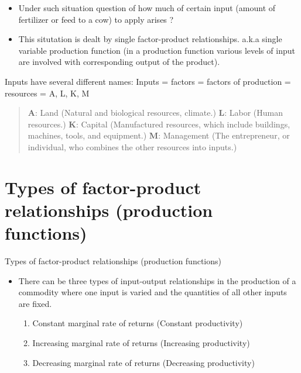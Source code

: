 \documentclass[12pt,ignorenonframetext,aspectratio=169]{beamer}
\providecommand{\tightlist}{%
  \setlength{\itemsep}{0pt}\setlength{\parskip}{0pt}}
\begin{document}
\begin{frame}{}
\protect\hypertarget{section}{}
\begin{itemize}
\tightlist
\item
  Under such situation question of how much of certain input (amount of
  fertilizer or feed to a cow) to apply arises ?
\item
  This situtation is dealt by single factor-product relationships. a.k.a
  single variable production function (in a production function various
  levels of input are involved with corresponding output of the
  product).
\end{itemize}

\begin{block}{Inputs have several different names:}
\protect\hypertarget{inputs-have-several-different-names}{}
Inputs = factors = factors of production = resources = A, L, K, M

\begin{quote}
\textbf{A}: Land (Natural and biological resources, climate.)
\newline \textbf{L}: Labor (Human resources.) \newline \textbf{K}:
Capital (Manufactured resources, which include buildings, machines,
tools, and equipment.) \newline \textbf{M}: Management (The
entrepreneur, or individual, who combines the other resources into
inputs.)
\end{quote}
\end{block}
\end{frame}

\hypertarget{types-of-factor-product-relationships-production-functions}{%
\section{Types of factor-product relationships (production
functions)}\label{types-of-factor-product-relationships-production-functions}}

\begin{frame}{Types of factor-product relationships (production
functions)}
\begin{itemize}
\tightlist
\item
  There can be three types of input-output relationships in the
  production of a commodity where one input is varied and the quantities
  of all other inputs are fixed.

  \begin{enumerate}
  \tightlist
  \item
    Constant marginal rate of returns (Constant productivity)
  \item
    Increasing marginal rate of returns (Increasing productivity)
  \item
    Decreasing marginal rate of returns (Decreasing productivity)
  \end{enumerate}
\end{itemize}
\end{frame}
\end{document}

